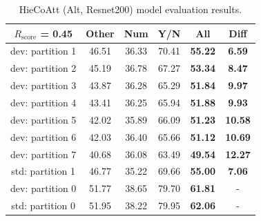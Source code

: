 \documentclass[letterpaper]{article}
\newcommand{\rscore}{}\def\rscore/{$R_{\text{score}}$}
\begin{document}
\begin{table}
\begin{subtable}{0.49\linewidth}
		\begin{tabular}{c | c c c c | c}
			\rscore/ = 0.45  & Other & Num   & Y/N   & All            & Diff           \\ [0.5ex]
			\hline
			dev: partition 1 & 46.51 & 36.33 & 70.41 & \textbf{55.22} & \textbf{6.59}  \\
			dev: partition 2 & 45.19 & 36.78 & 67.27 & \textbf{53.34} & \textbf{8.47}  \\
			dev: partition 3 & 43.87 & 36.28 & 65.29 & \textbf{51.84} & \textbf{9.97}  \\
			dev: partition 4 & 43.41 & 36.25 & 65.94 & \textbf{51.88} & \textbf{9.93}  \\
			dev: partition 5 & 42.02 & 35.89 & 66.09 & \textbf{51.23} & \textbf{10.58} \\
			dev: partition 6 & 42.03 & 36.40 & 65.66 & \textbf{51.12} & \textbf{10.69} \\
			dev: partition 7 & 40.68 & 36.08 & 63.49 & \textbf{49.54} & \textbf{12.27} \\
			\hline
			std: partition 1 & 46.77 & 35.22 & 69.66 & \textbf{55.00} & \textbf{7.06}  \\
			\hline
			dev: partition 0 & 51.77 & 38.65 & 79.70 & \textbf{61.81} & -              \\
			std: partition 0 & 51.95 & 38.22 & 79.95 & \textbf{62.06} & -              \\
			\hline
		\end{tabular}
		\caption{HieCoAtt (Alt, Resnet200) model evaluation results.}


\end{subtable}
\end{table}
\end{document}
